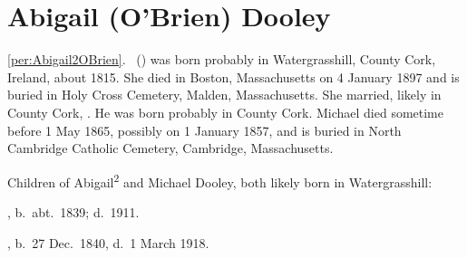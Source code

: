 \section{Abigail (O'Brien) Dooley}

\ref{per:Abigail2OBrien}.\  () was born probably in Watergrasshill, County Cork, Ireland, about 1815.\cite{Census1855Abigail} She died in Boston, Massachusetts on 4 January 1897\cite{Abigail2OBrienDeath} and is buried in Holy Cross Cemetery, Malden, Massachusetts.\cite{CarolGordon} She married, likely in County Cork, .\cite{Abigail2OBrienDeath} He was born probably in County Cork.\cite{MichaelDooleyBirth} Michael died sometime before 1 May 1865,\cite{Census1865Abigail} possibly on 1 January 1857,\cite{MichaelDooleyDeath} and is buried in North Cambridge Catholic Cemetery, Cambridge, Massachusetts.\cite{DianaBerberenaLetter2}

\begin{KidsIntro}
	Children of Abigail\textsuperscript{2} and Michael Dooley, both likely born in Watergrasshill:
\end{KidsIntro}

\begin{Kids}
	, b.\ abt.\ 1839; d.\ 1911.
	
	, b.\ 27 Dec.\ 1840, d.\ 1 March 1918.

\end{Kids}
